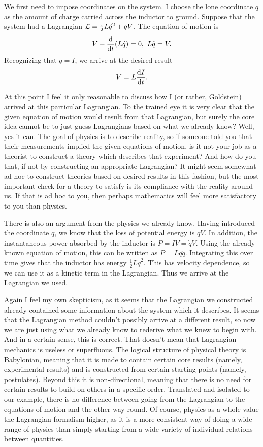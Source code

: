 We first need to impose coordinates on the system. I choose the lone coordinate $q$ as the amount of charge carried across the inductor to ground. Suppose that the system had a Lagrangian $\mathcal{L} = \frac{1}{2}L\dot{q}^{2} + qV$. The equation of motion is
\begin{align*}
V - \dv{t}(L\dot{q}) = 0,\ L\ddot{q} = V.
\end{align*}
Recognizing that $\dot{q} = I$, we arrive at the desired result
\begin{align*}
V = L\dv{I}{t}.
\end{align*}

At this point I feel it only reasonable to discuss how I (or rather, Goldstein) arrived at this particular Lagrangian. To the trained eye it is very clear that the given equation of motion would result from that Lagrangian, but surely the core idea cannot be to just guess Lagrangians based on what we already know? Well, yes it can. The goal of physics is to describe reality, so if someone told you that their measurements implied the given equations of motion, is it not your job as a theorist to construct a theory which describes that experiment? And how do you that, if not by constructing an appropriate Lagrangian? It might seem somewhat ad hoc to construct theories based on desired results in this fashion, but the most important check for a theory to satisfy is its compliance with the reality around us. If that is ad hoc to you, then perhaps mathematics will feel more satisfactory to you than physics.

There is also an argument from the physics we already know. Having introduced the coordinate $q$, we know that the loss of potential energy is $qV$. In addition, the instantaneous power absorbed by the inductor is $P = IV = \dot{q}V$. Using the already known equation of motion, this can be written as $P = L\dot{q}\ddot{q}$. Integrating this over time gives that the inductor has energy $\frac{1}{2}L\dot{q}^{2}$. This has velocity dependence, so we can use it as a kinetic term in the Lagrangian. Thus we arrive at the Lagrangian we used.

Again I feel my own skepticism, as it seems that the Lagrangian we constructed already contained some information about the system which it describes. It seems that the Lagrangian method couldn't possibly arrive at a different result, so now we are just using what we already know to rederive what we knew to begin with. And in a certain sense, this is correct. That doesn't mean that Lagrangian mechanics is useless or superfluous. The logical structure of physical theory is Babylonian, meaning that it is made to contain certain core results (namely, experimental results) and is constructed from certain starting points (namely, postulates). Beyond this it is non-directional, meaning that there is no need for certain results to build on others in a specific order. Translated and isolated to our example, there is no difference between going from the Lagrangian to the equations of motion and the other way round. Of course, physics as a whole value the Lagrangian formalism higher, as it is a more consistent way of doing a wide range of physics than simply starting from a wide variety of individual relations between quantities.


